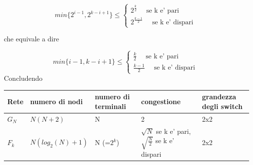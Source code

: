 \documentclass{article}
\begin{document}
        \begin{equation*}
          min\{2^{i-1},2^{k-i+1}\}\leq \begin{cases}
            2^{\frac{k}{2}} \quad \text{ se k e' pari }\\ 
            2^{\frac{k-1}{2}} \quad \text{  se k e' dispari }
          \end{cases}
        \end{equation*}
        \begin{flushleft}
          che equivale a dire
        \end{flushleft}
        \begin{equation*}
          min\{i-1,k-i+1\}\leq \begin{cases}
            \frac{k}{2} \quad \text{ se k e' pari }\\ 
            \frac{k-1}{2} \quad \text{  se k e' dispari }
          \end{cases}
        \end{equation*}
        Concludendo
        \begin{center}
          \begin{tabular}{ | m{1cm} | m{3cm}| m{3cm} | m{9em} | m{3cm} |} 
            \hline
            Rete & numero di nodi& numero di terminali& congestione& grandezza degli switch\\ 
            \hline
            $G_N$ & $N(N+2)$ & N& 2& 2x2\\ 
            \hline
            $F_k$ & $N(log_2(N)+1)$ & N (=$2^k$)& $\sqrt{N}$ se k e' pari,\quad $\sqrt{\frac{N}{2}}$ se k e' dispari& 2x2\\ 
            \hline
          \end{tabular}
        \end{center}
\end{document}
